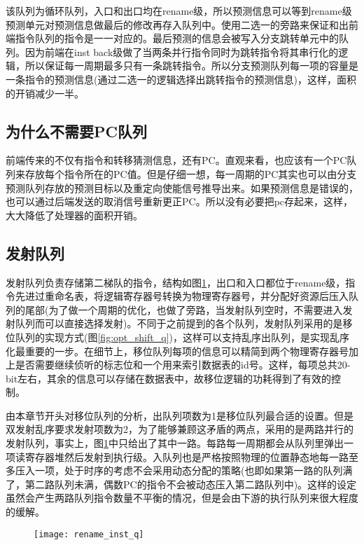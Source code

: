 该队列为循环队列，入口和出口均在rename级，所以预测信息可以等到rename级预测单元对预测信息做最后的修改再存入队列中。使用二选一的旁路来保证和出前端指令队列的指令是一一对应的。最后预测的信息会被写入分支跳转单元中的队列。因为前端在inst back级做了当两条并行指令同时为跳转指令将其串行化的逻辑，所以保证每一周期最多只有一条跳转指令。所以分支预测队列每一项的容量是一条指令的预测信息(通过二选一的逻辑选择出跳转指令的预测信息)，这样，面积的开销减少一半。

\subsection{为什么不需要PC队列}

前端传来的不仅有指令和转移猜测信息，还有PC。直观来看，也应该有一个PC队列来存放每个指令所在的PC值。但是仔细一想，每一周期的PC其实也可以由分支预测队列存放的预测目标以及重定向使能信号推导出来。如果预测信息是错误的，也可以通过后端发送的取消信号重新更正PC。所以没有必要把pc存起来，这样，大大降低了处理器的面积开销。

\subsection{发射队列}

发射队列负责存储第二梯队的指令，结构如图\ref{fig:rename_inst_q}，出口和入口都位于rename级，指令先进过重命名表，将逻辑寄存器号转换为物理寄存器号，并分配好资源后压入队列的尾部(为了做一个周期的优化，也做了旁路，当发射队列空时，不需要进入发射队列而可以直接选择发射)。不同于之前提到的各个队列，发射队列采用的是移位队列的实现方式(图\ref{fig:opt_shift_q})，这样可以支持乱序出队列，是实现乱序化最重要的一步。在细节上，移位队列每项的信息可以精简到两个物理寄存器号加上是否需要继续侦听的标志位和一个用来索引数据表的id号。这样，每项总共20-bit左右，其余的信息可以存储在数据表中，故移位逻辑的功耗得到了有效的控制。

由本章节开头对移位队列的分析，出队列项数为1是移位队列最合适的设置。但是双发射乱序要求发射项数为2，为了能够兼顾这矛盾的两点，采用的是两路并行的发射队列，事实上，图\ref{fig:rename_inst_q}中只给出了其中一路。每路每一周期都会从队列里弹出一项读寄存器堆然后发射到执行级。入队列也是严格按照物理的位置静态地每一路至多压入一项，处于时序的考虑不会采用动态分配的策略(也即如果第一路的队列满了，第二路队列未满，偶数PC的指令不会被动态压入第二路队列中)。这样的设定虽然会产生两路队列指令数量不平衡的情况，但是会由下游的执行队列来很大程度的缓解。
\begin{figure}[!htbp]
	\centering
	\texttt{[image: rename\_inst\_q]}
	\label{fig:rename_inst_q}
\end{figure}

